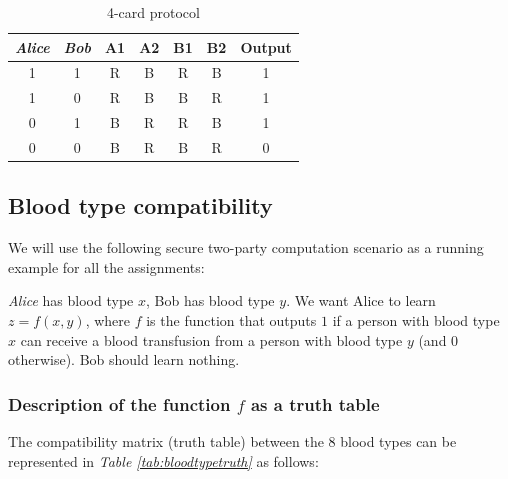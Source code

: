 \documentclass{article}
\begin{document}
\begin{table}[h!]
    \centering
    \begin{tabular}{|c|c||c|c|c|c||c|}
         \hline\hline
       \textit{Alice}  & \textit{Bob} & \textbf{A1} & \textbf{A2} & \textbf{B1} & \textbf{B2} & Output \\
         \hline 
       1  &1 & R & B & R &B &1 \\
         \hline 
       1  & 0 &R & B  & B& R &1 \\
         \hline 
       0  & 1 &B & R& R &B &1 \\
         \hline 
       0   & 0 &B &R &B &R &0 \\
        \hline
    \end{tabular}
    \caption{4-card protocol}
    \label{tab:4cardproto}
\end{table}

\subsection{Blood type compatibility}


We will use the following secure two-party computation scenario as a running example for all the assignments: 

\textit{Alice} has blood type $x$, Bob has blood type $y$. We want Alice to learn $z=f(x,y)$, where $f$ is the function that outputs $1$ if a person with blood type $x$ can receive a blood transfusion from a person with blood type $y$ (and $0$ otherwise). Bob should learn nothing.

\subsubsection{Description of the function $f$ as a truth table}

The compatibility matrix (truth table)\cite{au.mpc.a1.bloodtype} between the $8$ blood types can be represented in \textit{Table \ref{tab:bloodtypetruth}} as follows:


\end{document}
